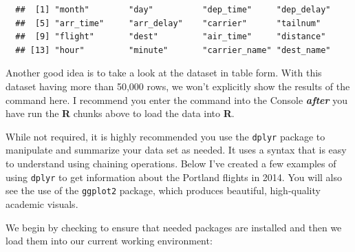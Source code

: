 \documentclass[12pt,twoside]{reedthesis}
\theoremstyle{definition}
\theoremstyle{definition}
\theoremstyle{remark}
\begin{document}
  \begin{Shaded}
  \begin{Highlighting}[]
  \end{Highlighting}
  \end{Shaded}
  
  \begin{verbatim}
  ##  [1] "month"        "day"          "dep_time"     "dep_delay"   
  ##  [5] "arr_time"     "arr_delay"    "carrier"      "tailnum"     
  ##  [9] "flight"       "dest"         "air_time"     "distance"    
  ## [13] "hour"         "minute"       "carrier_name" "dest_name"
  \end{verbatim}
  
  Another good idea is to take a look at the dataset in table form. With
  this dataset having more than 50,000 rows, we won't explicitly show the
  results of the command here. I recommend you enter the command into the
  Console \textbf{\emph{after}} you have run the \textbf{R} chunks above
  to load the data into \textbf{R}.
  
  \begin{Shaded}
  \begin{Highlighting}[]
  \end{Highlighting}
  \end{Shaded}
  
  While not required, it is highly recommended you use the \texttt{dplyr}
  package to manipulate and summarize your data set as needed. It uses a
  syntax that is easy to understand using chaining operations. Below I've
  created a few examples of using \texttt{dplyr} to get information about
  the Portland flights in 2014. You will also see the use of the
  \texttt{ggplot2} package, which produces beautiful, high-quality
  academic visuals.
  
  We begin by checking to ensure that needed packages are installed and
  then we load them into our current working environment:
  
\end{document}
